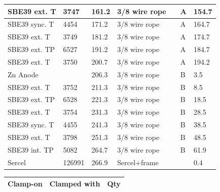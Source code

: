 \documentclass{article}
\begin{document}
\begin{tabularx}{\linewidth}{|l|l|l|X|l|l|l|}
SBE39 ext. T & 3747 & 161.2 & 3/8 wire rope &  & A & 154.7 \\ \hline
SBE39 sync. T & 4454 & 171.2 & 3/8 wire rope &  & A & 164.7 \\ \hline
SBE39 ext. T & 3749 & 181.2 & 3/8 wire rope &  & A & 174.7 \\ \hline
SBE39 ext. TP & 6527 & 191.2 & 3/8 wire rope &  & A & 184.7 \\ \hline
SBE39 ext. T & 3750 & 200.7 & 3/8 wire rope &  & A & 194.2 \\ \hline
Zn Anode &  & 206.3 & 3/8 wire rope &  & B & 3.5 \\ \hline
SBE39 ext. T & 3752 & 211.3 & 3/8 wire rope &  & B & 8.5 \\ \hline
SBE39 ext. TP & 6528 & 221.3 & 3/8 wire rope &  & B & 18.5 \\ \hline
SBE39 ext. T & 3754 & 231.3 & 3/8 wire rope &  & B & 28.5 \\ \hline
SBE39 sync. T & 4455 & 241.3 & 3/8 wire rope &  & B & 38.5 \\ \hline
SBE39 ext. T & 3798 & 251.3 & 3/8 wire rope &  & B & 48.5 \\ \hline
SBE39 int. TP & 5082 & 264.7 & 3/8 wire rope &  & B & 61.9 \\ \hline
Sercel & 126991 & 266.9 & Sercel+frame &  &  & 0.4 \\ \hline
\end{tabularx}
\begin{tabularx}{\linewidth}{|l|l|l|}
\caption{N280 \textcolor{red}{$\blacksquare$}: Clamped with summary}\\
\hline
\textbf{Clamp-on} & \textbf{Clamped with} & \textbf{Qty} \\
\hline
\end{tabularx}
\end{document}
